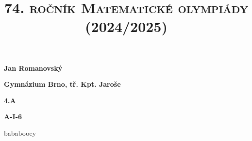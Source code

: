 \documentclass{article}
\title{\normalsize{\vspace{-2cm}\textsc{74. ročník Matematické olympiády (2024/2025)}\vspace{-1.7cm}}}
\date{}
\author{}
\begin{document}
\maketitle

\textbf{ }

\noindent \textbf{Jan Romanovský}

\noindent \textbf{Gymnázium Brno, tř. Kpt. Jaroše}

\noindent \textbf{4.A}

\noindent \textbf{A-\textrm{I}-6}

\textbf{ }

bababooey
\end{document}
